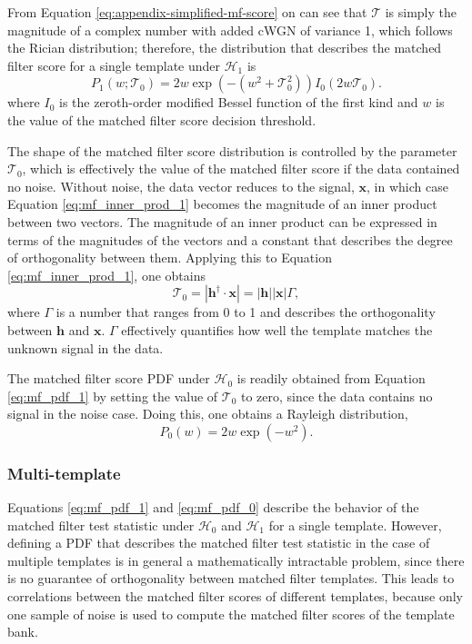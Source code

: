 From Equation \ref{eq:appendix-simplified-mf-score} on can see that $\mathcal{T}$ is simply the magnitude of a complex number with added cWGN of variance 1, which follows the Rician distribution; therefore, the distribution that describes the matched filter score for a single template under $\mathcal{H}_1$ is
\begin{equation}
    P_1(w;\mathcal{T}_0) = 2w\exp{\left(-\left(w^2+\mathcal{T}_0^2 \right)\right)}I_0(2w\mathcal{T}_0).
    \label{eq:mf_pdf_1}
\end{equation}
where $I_0$ is the zeroth-order modified Bessel function of the first kind and $w$ is the value of the matched filter score decision threshold. 

The shape of the matched filter score distribution is controlled by the parameter $\mathcal{T}_0$, which is effectively the value of the matched filter score if the data contained no noise. Without noise, the data vector reduces to the signal, $\mathbf{x}$, in which case Equation \ref{eq:mf_inner_prod_1} becomes the magnitude of an inner product between two vectors. The magnitude of an inner product can be expressed in terms of the magnitudes of the vectors and a constant that describes the degree of orthogonality between them. Applying this to Equation \ref{eq:mf_inner_prod_1}, one obtains
\begin{equation}
    \mathcal{T}_0=\left|\mathbf{h}^\dagger\cdot\mathbf{x}\right| = \left|\mathbf{h}\right|\left|\mathbf{x}\right|\Gamma,
    \label{eq:ideal_mf_score}
\end{equation}
where $\Gamma$ is a number that ranges from 0 to 1 and describes the orthogonality between $\mathbf{h}$ and $\mathbf{x}$. $\Gamma$ effectively quantifies how well the template matches the unknown signal in the data.

The matched filter score PDF under $\mathcal{H}_0$ is readily obtained from Equation \ref{eq:mf_pdf_1} by setting the value of $\mathcal{T}_\mathrm{0}$ to zero, since the data contains no signal in the noise case. Doing this, one obtains a Rayleigh distribution,
\begin{equation}
    P_0(w) = 2w\exp{\left(-w^2\right)}.
    \label{eq:mf_pdf_0}
\end{equation}

\subsubsection*{Multi-template}

Equations \ref{eq:mf_pdf_1} and \ref{eq:mf_pdf_0} describe the behavior of the matched filter test statistic under $\mathcal{H}_0$ and $\mathcal{H}_1$ for a single template. However, defining a PDF that describes the matched filter test statistic in the case of multiple templates is in general a mathematically intractable problem, since there is no guarantee of orthogonality between matched filter templates. This leads to correlations between the matched filter scores of different templates, because only one sample of noise is used to compute the matched filter scores of the template bank. 

